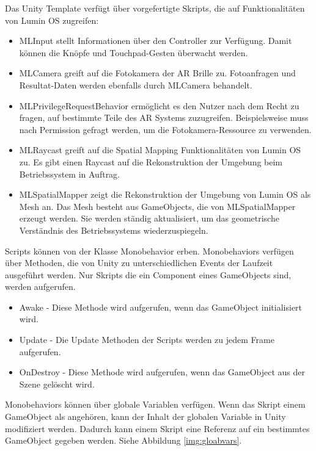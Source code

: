 Das Unity Template verfügt über vorgefertigte Skripts, die auf Funktionalitäten von Lumin OS zugreifen:

\begin{itemize}
	\item MLInput stellt Informationen über den Controller zur Verfügung. Damit können die Knöpfe und Touchpad-Gesten überwacht werden.
	\item MLCamera greift auf die Fotokamera der AR Brille zu. Fotoanfragen und Resultat-Daten werden ebenfalls durch MLCamera behandelt.
	\item MLPrivilegeRequestBehavior ermöglicht es den Nutzer nach dem Recht zu fragen, auf bestimmte Teile des AR Systems zuzugreifen. Beispielsweise muss nach Permission gefragt werden, um die Fotokamera-Ressource zu verwenden. 
	\item MLRaycast greift auf die Spatial Mapping Funktionalitäten von Lumin OS zu. Es gibt einen Raycast auf die Rekonstruktion der Umgebung beim Betriebssystem in Auftrag. 
	\item MLSpatialMapper zeigt die Rekonstruktion der Umgebung von Lumin OS als Mesh an. Das Mesh besteht aus GameObjects, die von MLSpatialMapper erzeugt werden. Sie werden ständig aktualisiert, um das geometrische Verständnis des Betriebssystems wiederzuspiegeln.
\end{itemize}

Scripts können von der Klasse Monobehavior erben. Monobehaviors verfügen über Methoden, die von Unity zu unterschiedlichen Events der Laufzeit ausgeführt werden. Nur Skripts die ein Component eines GameObjects sind, werden aufgerufen.

\begin{itemize}
	\item Awake - Diese Methode wird aufgerufen, wenn das GameObject initialisiert wird. %
	\item Update - Die Update Methoden der Scripts werden zu jedem Frame aufgerufen.
	\item OnDestroy - Diese Methode wird aufgerufen, wenn das GameObject aus der Szene gelöscht wird.
\end{itemize}

Monobehaviors können über globale Variablen verfügen. Wenn das Skript einem GameObject als angehören, kann der Inhalt der globalen Variable in Unity modifiziert werden. Dadurch kann einem Skript eine Referenz auf ein bestimmtes GameObject gegeben werden. Siehe Abbildung \ref{img:gloabvars}.


